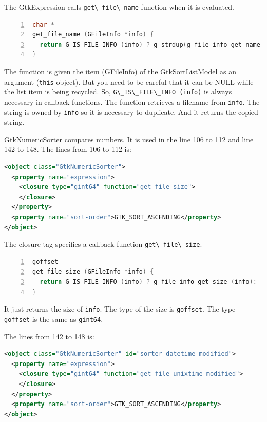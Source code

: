 The GtkExpression calls \passthrough{\lstinline!get\_file\_name!}
function when it is evaluated.

\begin{lstlisting}[language=C, numbers=left]
char *
get_file_name (GFileInfo *info) {
  return G_IS_FILE_INFO (info) ? g_strdup(g_file_info_get_name (info)) : NULL;
}
\end{lstlisting}

The function is given the item (GFileInfo) of the GtkSortListModel as an
argument (\passthrough{\lstinline!this!} object). But you need to be
careful that it can be NULL while the list item is being recycled. So,
\passthrough{\lstinline!G\_IS\_FILE\_INFO (info)!} is always necessary
in callback functions. The function retrieves a filename from
\passthrough{\lstinline!info!}. The string is owned by
\passthrough{\lstinline!info!} so it is necessary to duplicate. And it
returns the copied string.

GtkNumericSorter compares numbers. It is used in the line 106 to 112 and
line 142 to 148. The lines from 106 to 112 is:

\begin{lstlisting}[language=XML]
<object class="GtkNumericSorter">
  <property name="expression">
    <closure type="gint64" function="get_file_size">
    </closure>
  </property>
  <property name="sort-order">GTK_SORT_ASCENDING</property>
</object>
\end{lstlisting}

The closure tag specifies a callback function
\passthrough{\lstinline!get\_file\_size!}.

\begin{lstlisting}[language=C, numbers=left]
goffset
get_file_size (GFileInfo *info) {
  return G_IS_FILE_INFO (info) ? g_file_info_get_size (info): -1;
}
\end{lstlisting}

It just returns the size of \passthrough{\lstinline!info!}. The type of
the size is \passthrough{\lstinline!goffset!}. The type
\passthrough{\lstinline!goffset!} is the same as
\passthrough{\lstinline!gint64!}.

The lines from 142 to 148 is:

\begin{lstlisting}[language=XML]
<object class="GtkNumericSorter" id="sorter_datetime_modified">
  <property name="expression">
    <closure type="gint64" function="get_file_unixtime_modified">
    </closure>
  </property>
  <property name="sort-order">GTK_SORT_ASCENDING</property>
</object>
\end{lstlisting}

